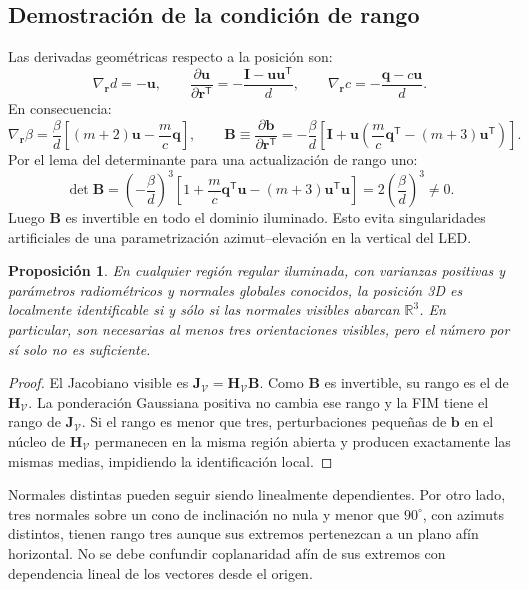 \documentclass[11pt,a4paper]{article}
\newtheorem{proposition}{Proposición}
\newcommand{\RR}{\mathbb R}
\begin{document}
\subsection{Demostración de la condición de rango}
Las derivadas geométricas respecto a la posición son:
\begin{equation}
\nabla_{\mathbf r}d=-\mathbf u,\qquad
\frac{\partial\mathbf u}{\partial\mathbf r^{\mathsf T}}=-\frac{\mathbf I-\mathbf u\mathbf u^{\mathsf T}}{d},\qquad
\nabla_{\mathbf r}c=-\frac{\mathbf q-c\mathbf u}{d}.
\label{eq:geoderivatives}
\end{equation}
En consecuencia:
\begin{equation}
\nabla_{\mathbf r}\beta=\frac{\beta}{d}\left[(m+2)\mathbf u-\frac{m}{c}\mathbf q\right],\qquad
\mathbf B\equiv\frac{\partial\mathbf b}{\partial\mathbf r^{\mathsf T}}
=-\frac{\beta}{d}\left[\mathbf I+\mathbf u\left(\frac{m}{c}\mathbf q^{\mathsf T}-(m+3)\mathbf u^{\mathsf T}\right)\right].
\label{eq:B}
\end{equation}
Por el lema del determinante para una actualización de rango uno:
\begin{equation}
\det\mathbf B=\left(-\frac{\beta}{d}\right)^3
\left[1+\frac{m}{c}\mathbf q^{\mathsf T}\mathbf u-(m+3)\mathbf u^{\mathsf T}\mathbf u\right]
=2\left(\frac{\beta}{d}\right)^3\ne0.
\label{eq:det}
\end{equation}
Luego $\mathbf B$ es invertible en todo el dominio iluminado. Esto evita singularidades artificiales de una parametrización azimut--elevación en la vertical del LED.

\begin{proposition}
En cualquier región regular iluminada, con varianzas positivas y parámetros radiométricos y normales globales conocidos, la posición 3D es localmente identificable si y sólo si las normales visibles abarcan $\RR^3$. En particular, son necesarias al menos tres orientaciones visibles, pero el número por sí solo no es suficiente.
\end{proposition}
\begin{proof}
El Jacobiano visible es $\mathbf J_{\mathcal V}=\mathbf H_{\mathcal V}\mathbf B$. Como $\mathbf B$ es invertible, su rango es el de $\mathbf H_{\mathcal V}$. La ponderación Gaussiana positiva no cambia ese rango y la FIM tiene el rango de $\mathbf J_{\mathcal V}$. Si el rango es menor que tres, perturbaciones pequeñas de $\mathbf b$ en el núcleo de $\mathbf H_{\mathcal V}$ permanecen en la misma región abierta y producen exactamente las mismas medias, impidiendo la identificación local.
\end{proof}
Normales distintas pueden seguir siendo linealmente dependientes. Por otro lado, tres normales sobre un cono de inclinación no nula y menor que $90^\circ$, con azimuts distintos, tienen rango tres aunque sus extremos pertenezcan a un plano afín horizontal. No se debe confundir coplanaridad afín de sus extremos con dependencia lineal de los vectores desde el origen.
\end{document}
